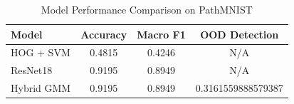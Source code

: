 \begin{table}[h]
\centering
\caption{Model Performance Comparison on PathMNIST}
\label{tab:comparison}
\begin{tabular}{lccc}
\toprule
Model & Accuracy & Macro F1 & OOD Detection \\
\midrule
HOG + SVM & 0.4815 & 0.4246 & N/A \\
ResNet18 & 0.9195 & 0.8949 & N/A \\
Hybrid GMM & 0.9195 & 0.8949 & 0.3161559888579387 \\
\bottomrule
\end{tabular}
\end{table}
